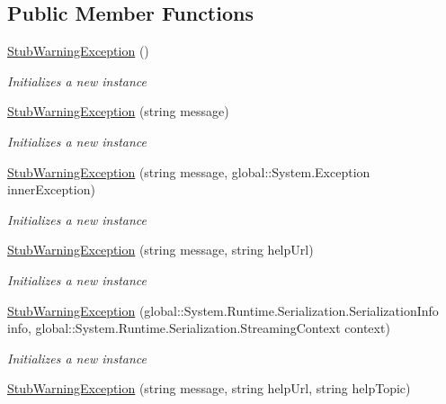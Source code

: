 \subsection*{Public Member Functions}
\begin{DoxyCompactItemize}
\item 
\hyperlink{class_system_1_1_component_model_1_1_fakes_1_1_stub_warning_exception_a9f905c67c7d1f89b95fafb648f44ac43}{Stub\-Warning\-Exception} ()
\begin{DoxyCompactList}\small\item\em Initializes a new instance\end{DoxyCompactList}\item 
\hyperlink{class_system_1_1_component_model_1_1_fakes_1_1_stub_warning_exception_ab4796220d1d7977543eaa95d40c5d2ac}{Stub\-Warning\-Exception} (string message)
\begin{DoxyCompactList}\small\item\em Initializes a new instance\end{DoxyCompactList}\item 
\hyperlink{class_system_1_1_component_model_1_1_fakes_1_1_stub_warning_exception_a276b71a496fadba65020422dab03d49a}{Stub\-Warning\-Exception} (string message, global\-::\-System.\-Exception inner\-Exception)
\begin{DoxyCompactList}\small\item\em Initializes a new instance\end{DoxyCompactList}\item 
\hyperlink{class_system_1_1_component_model_1_1_fakes_1_1_stub_warning_exception_a035919a7516c1edb2ae878ec41e2a8cf}{Stub\-Warning\-Exception} (string message, string help\-Url)
\begin{DoxyCompactList}\small\item\em Initializes a new instance\end{DoxyCompactList}\item 
\hyperlink{class_system_1_1_component_model_1_1_fakes_1_1_stub_warning_exception_a1813692d66d5e0f08623e6751ba4e608}{Stub\-Warning\-Exception} (global\-::\-System.\-Runtime.\-Serialization.\-Serialization\-Info info, global\-::\-System.\-Runtime.\-Serialization.\-Streaming\-Context context)
\begin{DoxyCompactList}\small\item\em Initializes a new instance\end{DoxyCompactList}\item 
\hyperlink{class_system_1_1_component_model_1_1_fakes_1_1_stub_warning_exception_aee23572ead6dbcb8812bf7843fd313d7}{Stub\-Warning\-Exception} (string message, string help\-Url, string help\-Topic)

\end{DoxyCompactItemize}
